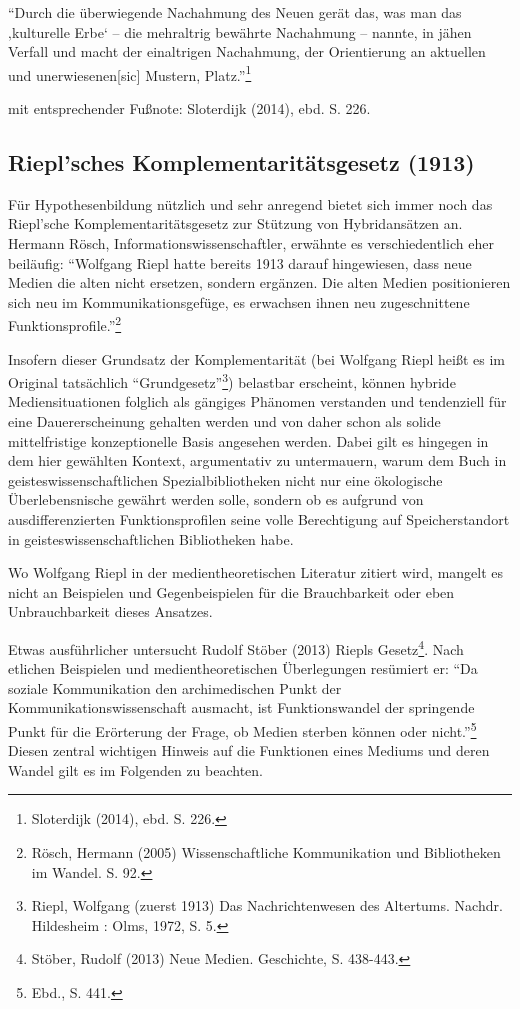 \documentclass[a4paper,
fontsize=11pt,
oneside,
numbers=noperiodatend,
parskip=half-,
bibliography=totoc,
final
]{scrartcl}
\begin{document}
\enquote{Durch die überwiegende Nachahmung des Neuen gerät das, was man
das ‚kulturelle Erbe` -- die mehraltrig bewährte Nachahmung -- nannte,
in jähen Verfall und macht der einaltrigen Nachahmung, der Orientierung
an aktuellen und unerwiesenen{[}sic{]} Mustern, Platz.}\footnote{Sloterdijk
  (2014), ebd. S. 226.}

mit entsprechender Fußnote: Sloterdijk (2014), ebd. S. 226.

\subsection*{Riepl'sches Komplementaritätsgesetz
(1913)}\label{rieplsches-komplementarituxe4tsgesetz-1913}

Für Hypothesenbildung nützlich und sehr anregend bietet sich immer noch
das Riepl'sche Komplementaritätsgesetz zur Stützung von Hybridansätzen
an. Hermann Rösch, Informationswissenschaftler, erwähnte es
verschiedentlich eher beiläufig: \enquote{Wolfgang Riepl hatte bereits
1913 darauf hingewiesen, dass neue Medien die alten nicht ersetzen,
sondern ergänzen. Die alten Medien positionieren sich neu im
Kommunikationsgefüge, es erwachsen ihnen neu zugeschnittene
Funktionsprofile.}\footnote{Rösch, Hermann (2005) Wissenschaftliche
  Kommunikation und Bibliotheken im Wandel. S. 92.}

Insofern dieser Grundsatz der Komplementarität (bei Wolfgang Riepl heißt
es im Original tatsächlich \enquote{Grundgesetz}\footnote{Riepl,
  Wolfgang (zuerst 1913) Das Nachrichtenwesen des Altertums. Nachdr.
  Hildesheim : Olms, 1972, S. 5.}) belastbar erscheint, können hybride
Mediensituationen folglich als gängiges Phänomen verstanden und
tendenziell für eine Dauererscheinung gehalten werden und von daher
schon als solide mittelfristige konzeptionelle Basis angesehen werden.
Dabei gilt es hingegen in dem hier gewählten Kontext, argumentativ zu
untermauern, warum dem Buch in geisteswissenschaftlichen
Spezialbibliotheken nicht nur eine ökologische Überlebensnische gewährt
werden solle, sondern ob es aufgrund von ausdifferenzierten
Funktionsprofilen seine volle Berechtigung auf Speicherstandort in
geisteswissenschaftlichen Bibliotheken habe.

Wo Wolfgang Riepl in der medientheoretischen Literatur zitiert wird,
mangelt es nicht an Beispielen und Gegenbeispielen für die Brauchbarkeit
oder eben Unbrauchbarkeit dieses Ansatzes.

Etwas ausführlicher untersucht Rudolf Stöber (2013) Riepls
Gesetz\footnote{Stöber, Rudolf (2013) Neue Medien. Geschichte, S.
  438-443.}. Nach etlichen Beispielen und medientheoretischen
Überlegungen resümiert er: \enquote{Da soziale Kommunikation den
archimedischen Punkt der Kommunikationswissenschaft ausmacht, ist
Funktionswandel der springende Punkt für die Erörterung der Frage, ob
Medien sterben können oder nicht.}\footnote{Ebd., S. 441.} Diesen
zentral wichtigen Hinweis auf die Funktionen eines Mediums und deren
Wandel gilt es im Folgenden zu beachten.
\end{document}
